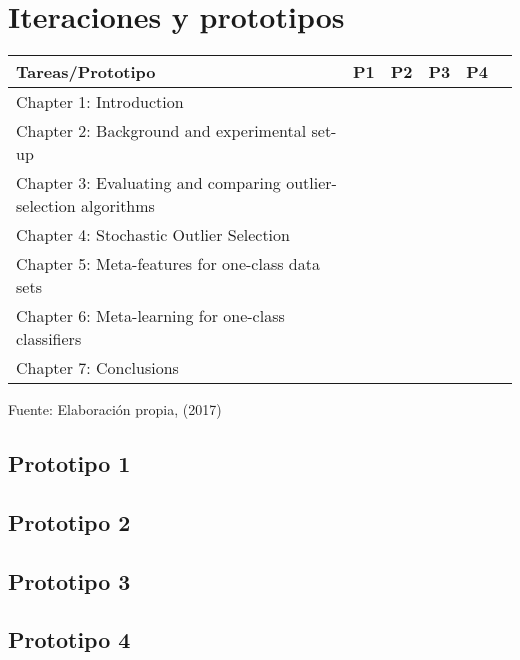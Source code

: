 \section{Iteraciones y prototipos}

\begin{table}[H]
\centering
{}
\begin{tabular}{lccccc}\toprule
Tareas/Prototipo&P1&P2&P3&P4\\
\midrule
\rowcolor[gray]{0.9}
Chapter 1: Introduction 											& \y & \y & \y & \y \\
Chapter 2: Background and experimental set-up 						&    & \y & \y & \y \\
\rowcolor[gray]{0.9}
Chapter 3: Evaluating and comparing outlier-selection algorithms 	&    & \y &    &    \\
Chapter 4: Stochastic Outlier Selection 							&    &    & \y &    \\
\rowcolor[gray]{0.9}
Chapter 5: Meta-features for one-class data sets 					&    &    &    & \y \\
Chapter 6: Meta-learning for one-class classifiers 					&    &    &    & \y \\
\rowcolor[gray]{0.9}
Chapter 7: Conclusions  											& \y & \y & \y & \y \\
\bottomrule
\end{tabular}
\medskip
\par\centering Fuente: Elaboración propia, (2017)
\end{table}


\subsection{Prototipo 1}

\subsection{Prototipo 2}

\subsection{Prototipo 3}

\subsection{Prototipo 4}